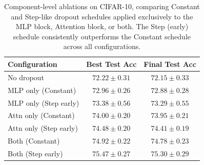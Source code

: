 \documentclass{article}
\theoremstyle{plain}
\theoremstyle{definition}
\theoremstyle{remark}
\begin{document}
\begin{table}[H]
 \caption{Component-level ablations on CIFAR-10, comparing Constant and Step-like dropout schedules applied exclusively to the MLP block, Attention block, or both. The Step (early) schedule consistently outperforms the Constant schedule across all configurations.}
 \label{tab:ablation_results}
 \centering
 \begin{tabular}{l c c}
 \toprule
 \textbf{Configuration} & \textbf{Best Test Acc} & \textbf{Final Test Acc} \\
 \midrule
 No dropout & $72.22 \pm 0.31$ & $72.15 \pm 0.33$ \\
 \midrule
 MLP only (Constant) & $72.96 \pm 0.26$ & $72.88 \pm 0.28$ \\
 MLP only (Step early) & $73.38 \pm 0.56$ & $73.29 \pm 0.55$ \\
 \midrule
 Attn only (Constant) & $74.00 \pm 0.20$ & $73.95 \pm 0.21$ \\
 Attn only (Step early) & $74.48 \pm 0.20$ & $74.41 \pm 0.19$ \\
 \midrule
 Both (Constant) & $74.92 \pm 0.22$ & $74.78 \pm 0.23$ \\
 Both (Step early) & $75.47 \pm 0.27$ & $75.30 \pm 0.29$ \\
 \bottomrule
 \end{tabular}
\end{table}

\FloatBarrier
\end{document}

